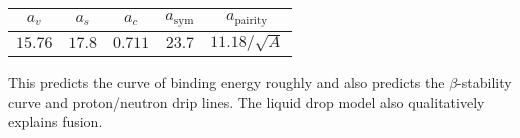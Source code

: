 \documentclass[a4paper,twoside,master.tex]{subfiles}
\begin{document}
\begin{tabular}{@{}ccccc@{}}
        \toprule
        $ a_v $ & $ a_s $ & $ a_c $ & $ a_{\text{sym}} $ & $ a_{\text{pairity}} $ \\
        \midrule 
        $ 15.76 $ & $ 17.8 $ & $ 0.711 $ & $ 23.7 $ & $ 11.18/ \sqrt{A} $ \\
        \bottomrule
\end{tabular}
This predicts the curve of binding energy roughly and also predicts the $ \beta $-stability curve and proton/neutron drip lines. The liquid drop model also qualitatively explains fusion.
\end{document}
